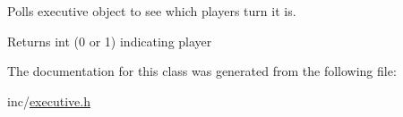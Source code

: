 Polls executive object to see which player\textquotesingle{}s turn it is. 

\begin{DoxyReturn}{Returns}
int (0 or 1) indicating player 
\end{DoxyReturn}


The documentation for this class was generated from the following file\+:\begin{DoxyCompactItemize}
\item 
inc/\mbox{\hyperlink{executive_8h}{executive.\+h}}\end{DoxyCompactItemize}
